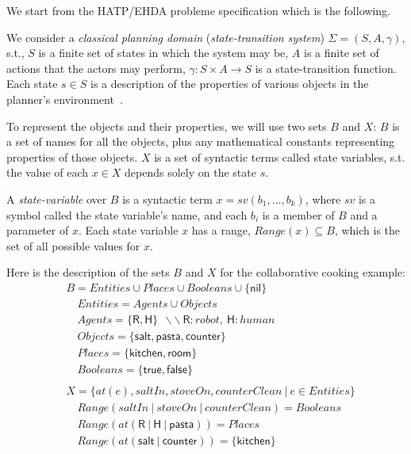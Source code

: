 We start from the HATP/EHDA probleme specification which is the following.

We consider a \textit{classical planning domain} (\textit{state-transition system}) $\Sigma = (S,A,\gamma)$, s.t., $S$ is a finite set of states in which the system may be, $A$ is a finite set of actions that the actors may perform, $\gamma : S \times A \rightarrow S$ is a state-transition function. Each state $s \in S$ is a description of the properties of various objects in the planner's environment~\cite{naubooks0014222}. 

To represent the objects and their properties, we will use two sets $B$ and $X$: $B$ is a set of names for all the objects, plus any mathematical constants representing properties of those objects. $X$ is a set of syntactic terms called state variables, s.t. the value of each $x \in X$ depends solely on the state $s$.

A \textit{state-variable} over $B$ is a syntactic term $x = sv(b_1, ..., b_k)$, where $sv$ is a symbol called the state variable's name, and each $b_i$ is a member of $B$ and a parameter of $x$. Each state variable $x$ has a range, $\textit{Range}(x) \subseteq B$, which is the set of all possible values for $x$.

Here is the description of the sets $B$ and $X$ for the collaborative cooking example:
{\small
\begin{align*}
&B           = Entities \cup Places \cup Booleans \cup \{\textsf{nil}\} \\
&\quad Entities    = Agents \cup Objects\\
&\quad Agents      = \{ \textsf{R}, \textsf{H} \} ~~ \backslash\backslash~\textsf{R}:robot,~\textsf{H}:human\\
&\quad Objects     = \{ \textsf{salt}, \textsf{pasta}, \textsf{counter} \}\\
&\quad Places      = \{ \textsf{kitchen}, \textsf{room} \}\\
&\quad Booleans    = \{ \textsf{true},\textsf{false} \}\\
&\\
&X = \{ at(e), saltIn, stoveOn, counterClean ~ | ~ e \in Entities \}\\
&\quad \textit{Range}(saltIn ~|~ stoveOn ~|~ counterClean)=Booleans\\
&\quad \textit{Range}(at(\textsf{R} ~|~ \textsf{H} ~|~ \textsf{pasta})) = Places\\
&\quad \textit{Range}(at(\textsf{salt} ~|~ \textsf{counter})) = \{ \textsf{kitchen} \}
\end{align*}
}

